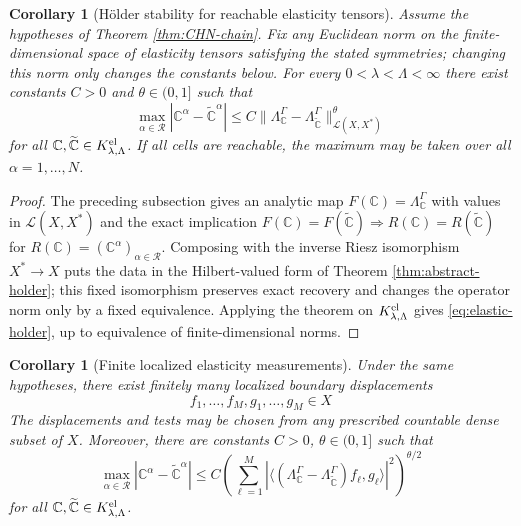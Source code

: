 \documentclass[12pt,oneside]{amsart}
\newtheorem{corollary}[theorem]{Corollary}
\newcommand{\cL}{\mathcal L}
\newcommand{\cR}{\mathcal R}
\newcommand{\dual}[2]{\langle #1,#2\rangle}
\begin{document}
\begin{corollary}[H\"older stability for reachable elasticity tensors]\label{cor:elastic-holder}
Assume the hypotheses of Theorem \ref{thm:CHN-chain}.  Fix any Euclidean norm on the finite-dimensional space of elasticity tensors satisfying the stated symmetries; changing this norm only changes the constants below.  For every $0<\lambda<\Lambda<\infty$ there exist constants $C>0$ and $\theta\in(0,1]$ such that
\begin{equation}\label{eq:elastic-holder}
        \max_{\alpha\in\cR}
        |\mathbb C^\alpha-
        \widetilde{\mathbb C}^{\alpha}|
        \le C
        \|\Lambda_{\mathbb C}^\Gamma-
        \Lambda_{\widetilde{\mathbb C}}^\Gamma\|_{\cL(X,X^*)}^{\theta}
\end{equation}
for all $\mathbb C,\widetilde{\mathbb C}\in K_{\lambda,\Lambda}^{\rm el}$.  If all cells are reachable, the maximum may be taken over all $\alpha=1,\ldots,N$.
\end{corollary}

\begin{proof}
The preceding subsection gives an analytic map
$F(\mathbb C)=\Lambda_{\mathbb C}^\Gamma$ with values in $\cL(X,X^*)$ and the
exact implication
$F(\mathbb C)=F(\widetilde{\mathbb C})\Rightarrow
R(\mathbb C)=R(\widetilde{\mathbb C})$ for
$R(\mathbb C)=(\mathbb C^\alpha)_{\alpha\in\cR}$.  Composing with the inverse
Riesz isomorphism $X^*\to X$ puts the data in the Hilbert-valued form of Theorem
\ref{thm:abstract-holder}; this fixed isomorphism preserves exact recovery and
changes the operator norm only by a fixed equivalence.  Applying the theorem on
$K_{\lambda,\Lambda}^{\rm el}$ gives \eqref{eq:elastic-holder}, up to equivalence
of finite-dimensional norms.
\end{proof}

\begin{corollary}[Finite localized elasticity measurements]\label{cor:elastic-finite}
Under the same hypotheses, there exist finitely many localized boundary
displacements
\[
        f_1,\ldots,f_M,
        g_1,\ldots,g_M\in X
\]
The displacements and tests may be chosen from any prescribed countable dense
subset of $X$.  Moreover, there are constants $C>0$, $\theta\in(0,1]$ such that
\[
        \max_{\alpha\in\cR}
        |\mathbb C^\alpha-
        \widetilde{\mathbb C}^{\alpha}|
        \le C
        \left(\sum_{\ell=1}^M
        \left|
        \dual{(\Lambda_{\mathbb C}^\Gamma-
        \Lambda_{\widetilde{\mathbb C}}^\Gamma)f_\ell}{g_\ell}
        \right|^2\right)^{\theta/2}
\]
for all $\mathbb C,\widetilde{\mathbb C}\in K_{\lambda,\Lambda}^{\rm el}$.
\end{corollary}
\end{document}
